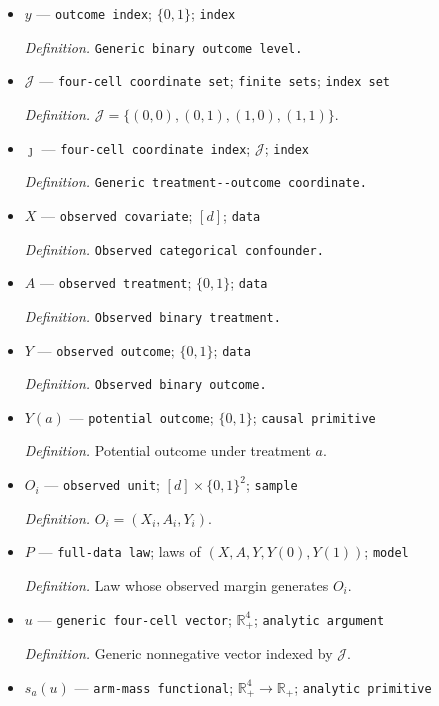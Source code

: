 \documentclass{article}
\begin{document}
\begin{itemize}
  \item \(y\) --- \texttt{outcome index}; \(\{0,1\}\); \texttt{index}
  \par\smallskip\noindent\emph{Definition.} \texttt{Generic binary outcome level.}
  \item \(\mathcal J\) --- \texttt{four-\allowbreak{}cell coordinate set}; \texttt{finite sets}; \texttt{index set}
  \par\smallskip\noindent\emph{Definition.} \(\mathcal J=\{(0,0),(0,1),(1,0),(1,1)\}\).
  \item \(\jmath\) --- \texttt{four-\allowbreak{}cell coordinate index}; \(\mathcal J\); \texttt{index}
  \par\smallskip\noindent\emph{Definition.} \texttt{Generic treatment-\allowbreak{}-\allowbreak{}outcome coordinate.}
  \item \(X\) --- \texttt{observed covariate}; \([d]\); \texttt{data}
  \par\smallskip\noindent\emph{Definition.} \texttt{Observed categorical confounder.}
  \item \(A\) --- \texttt{observed treatment}; \(\{0,1\}\); \texttt{data}
  \par\smallskip\noindent\emph{Definition.} \texttt{Observed binary treatment.}
  \item \(Y\) --- \texttt{observed outcome}; \(\{0,1\}\); \texttt{data}
  \par\smallskip\noindent\emph{Definition.} \texttt{Observed binary outcome.}
  \item \(Y(a)\) --- \texttt{potential outcome}; \(\{0,1\}\); \texttt{causal primitive}
  \par\smallskip\noindent\emph{Definition.} Potential outcome under treatment \(a\).
  \item \(O_i\) --- \texttt{observed unit}; \([d]\times\{0,1\}^2\); \texttt{sample}
  \par\smallskip\noindent\emph{Definition.} \(O_i=(X_i,A_i,Y_i)\).
  \item \(P\) --- \texttt{full-\allowbreak{}data law}; laws of \((X,A,Y,Y(0),Y(1))\); \texttt{model}
  \par\smallskip\noindent\emph{Definition.} Law whose observed margin generates \(O_i\).
  \item \(u\) --- \texttt{generic four-\allowbreak{}cell vector}; \(\mathbb R_+^4\); \texttt{analytic argument}
  \par\smallskip\noindent\emph{Definition.} Generic nonnegative vector indexed by \(\mathcal J\).
  \item \(s_a(u)\) --- \texttt{arm-\allowbreak{}mass functional}; \(\mathbb R_+^4\to\mathbb R_+\); \texttt{analytic primitive}

\end{itemize}
\end{document}

